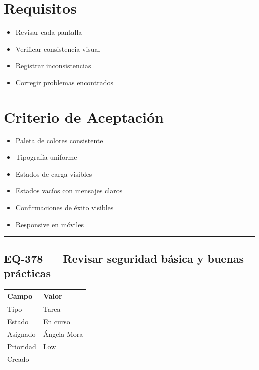 \documentclass[
  spanish,
  11pt,
]{report}
\newcounter{none} %
\providecommand{\tightlist}{%
  \setlength{\itemsep}{0pt}\setlength{\parskip}{0pt}}
\begin{document}
\section{Requisitos}\label{requisitos-14}

\begin{itemize}
\tightlist
\item
  Revisar cada pantalla
\item
  Verificar consistencia visual
\item
  Registrar inconsistencias
\item
  Corregir problemas encontrados
\end{itemize}

\section{Criterio de Aceptación}\label{criterio-de-aceptaciuxf3n-14}

\begin{itemize}
\tightlist
\item[$\square$]
  Paleta de colores consistente
\item[$\square$]
  Tipografía uniforme
\item[$\square$]
  Estados de carga visibles
\item[$\square$]
  Estados vacíos con mensajes claros
\item[$\square$]
  Confirmaciones de éxito visibles
\item[$\square$]
  Responsive en móviles
\end{itemize}

\begin{center}\rule{0.5\linewidth}{0.5pt}\end{center}

\subsection{EQ-378 --- Revisar seguridad básica y buenas
prácticas}\label{eq-378-revisar-seguridad-buxe1sica-y-buenas-pruxe1cticas}

{\def\LTcaptype{none} %
\begin{longtable}[]{@{}ll@{}}
\toprule\noalign{}
Campo & Valor \\
\midrule\noalign{}
\endhead
\bottomrule\noalign{}
\endlastfoot
Tipo & Tarea \\
Estado & En curso \\
Asignado & Ángela Mora \\
Prioridad & Low \\
Creado & \\
\end{longtable}
}
\end{document}
